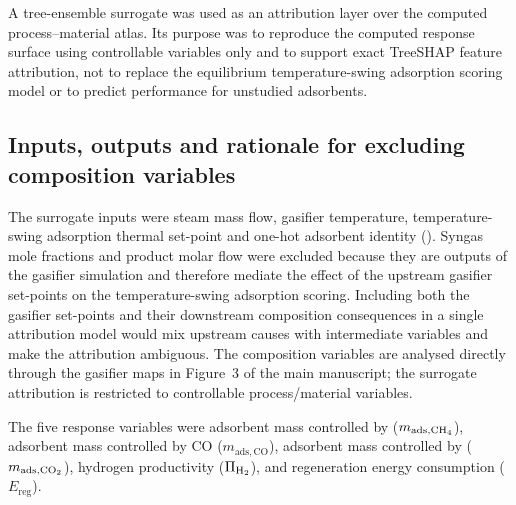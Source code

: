\documentclass[11pt,a4paper]{article}
\newcommand{\Htwo}{\ce{H2}}
\newcommand{\COtwo}{\ce{CO2}}
\newcommand{\CHfour}{\ce{CH4}}
\newcommand{\TSA}{temperature-swing adsorption}
\begin{document}
A tree-ensemble surrogate was used as an attribution layer over the computed
process--material atlas. Its purpose was to reproduce the computed response
surface using controllable variables only and to support exact TreeSHAP
feature attribution, not to replace the equilibrium \TSA{} scoring model or
to predict performance for unstudied adsorbents.

\subsection{Inputs, outputs and rationale for excluding composition variables}

The surrogate inputs were steam mass flow, gasifier temperature, \TSA{}
thermal set-point and one-hot adsorbent identity (). Syngas
mole fractions and product molar flow were excluded because they are outputs
of the gasifier simulation and therefore mediate the effect of the upstream
gasifier set-points on the \TSA{} scoring. Including both the gasifier
set-points and their downstream composition consequences in a single
attribution model would mix upstream causes with intermediate variables and
make the attribution ambiguous. The composition variables are analysed
directly through the gasifier maps in Figure~3 of the main manuscript; the
surrogate attribution is restricted to controllable process/material variables.

The five response variables were adsorbent mass controlled by \CHfour{}
($m_{\mathrm{ads},\CHfour}$), adsorbent mass controlled by CO
($m_{\mathrm{ads},\mathrm{CO}}$), adsorbent mass controlled by \COtwo{}
($m_{\mathrm{ads},\COtwo}$), hydrogen productivity ($\Pi_{\Htwo}$), and
regeneration energy consumption ($E_{\mathrm{reg}}$).
\end{document}
